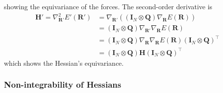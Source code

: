 \documentclass[pdflatex,sn-mathphys-num]{sn-jnl}%
\theoremstyle{thmstyleone}%
\theoremstyle{thmstyletwo}%
\theoremstyle{thmstylethree}%
\begin{document}
\begin{appendices}
showing the equivariance of the forces. The second-order derivative is
\begin{align}
    \mathbf{H}' = \nabla^2_\mathbf{R'} E'(\mathbf{R'}) &= \nabla_\mathbf{R'} ((\mathbf{I}_{N} \otimes \mathbf{Q})\nabla_\mathbf{R}E(\mathbf{R})) \\
    &=(\mathbf{I}_{N} \otimes \mathbf{Q})\nabla_\mathbf{R'}\nabla_\mathbf{R}E(\mathbf{R}) \\
    &=(\mathbf{I}_{N} \otimes \mathbf{Q})\nabla_\mathbf{R}\nabla_\mathbf{R}E(\mathbf{R}) (\mathbf{I}_{N} \otimes \mathbf{Q})^\top \\
    &=(\mathbf{I}_{N} \otimes \mathbf{Q})\mathbf{H} (\mathbf{I}_{N} \otimes \mathbf{Q})^\top
\end{align}
which shows the Hessian's equivariance. 

\subsubsection{Non-integrability of Hessians\label{sec:conservative}}

\end{appendices}
\end{document}
